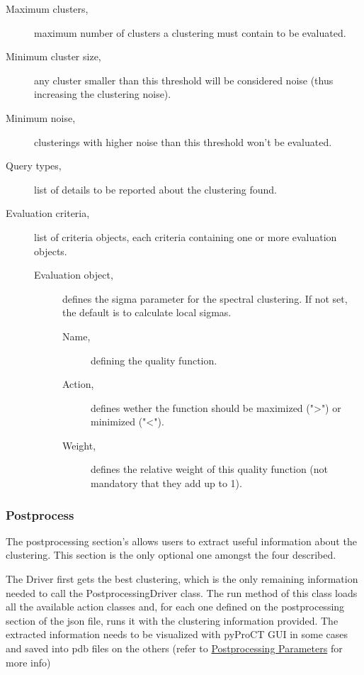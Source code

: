 \begin{description}
\begin{description}
\item [Maximum clusters,] maximum number of clusters a clustering must contain to be evaluated.
\item [Minimum cluster size,] any cluster smaller than this threshold will be considered noise (thus increasing the clustering noise).
\item [Minimum noise,] clusterings with higher noise than this threshold won't be evaluated.
\item [Query types,] list of details to be reported about the clustering found.
\item [Evaluation criteria,] list of criteria objects, each criteria containing one or more evaluation objects.
\begin{description}
\item [Evaluation object,] defines the sigma parameter for the spectral clustering. If not set, the default is to calculate local sigmas.
\begin{description}
\item [Name,] defining the quality function.
\item [Action,] defines wether the function should be maximized (">") or minimized ("<"). 
\item [Weight,] defines the relative weight of this quality function (not mandatory that they add up to 1).
\end{description}
\end{description} 
\end{description}
\end{description}



\subsubsection{Postprocess}

The postprocessing section's allows users to extract useful information about the clustering. This section is the only optional one amongst the four described. 

The Driver first gets the best clustering, which is the only remaining information needed to call the PostprocessingDriver class. The run method of this class loads all the available action classes and, for each one defined on the postprocessing section of the json file, runs it with the clustering information provided. The extracted information needs to be visualized with pyProCT GUI in some cases and saved into pdb files on the others (refer to \hyperref[subsec:postprocess:params]{Postprocessing Parameters} for more info)




